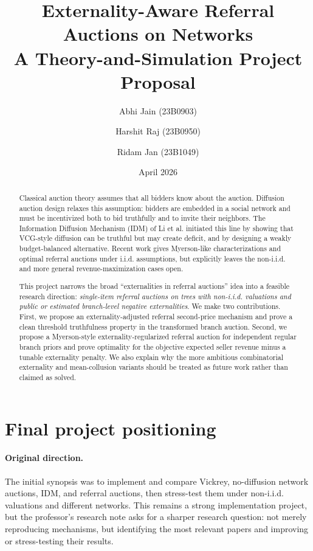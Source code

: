 \documentclass[11pt]{article}
\title{Externality-Aware Referral Auctions on Networks\\
\large A Theory-and-Simulation Project Proposal}
\author{Abhi Jain (23B0903) \and Harshit Raj (23B0950) \and Ridam Jan (23B1049)}
\date{April 2026}
\begin{document}
\maketitle

\begin{abstract}
Classical auction theory assumes that all bidders know about the auction. Diffusion auction design relaxes this assumption: bidders are embedded in a social network and must be incentivized both to bid truthfully and to invite their neighbors. The Information Diffusion Mechanism (IDM) of Li et al. initiated this line by showing that VCG-style diffusion can be truthful but may create deficit, and by designing a weakly budget-balanced alternative. Recent work gives Myerson-like characterizations and optimal referral auctions under i.i.d. assumptions, but explicitly leaves the non-i.i.d. and more general revenue-maximization cases open.

This project narrows the broad ``externalities in referral auctions'' idea into a feasible research direction: \emph{single-item referral auctions on trees with non-i.i.d. valuations and public or estimated branch-level negative externalities}. We make two contributions. First, we propose an externality-adjusted referral second-price mechanism and prove a clean threshold truthfulness property in the transformed branch auction. Second, we propose a Myerson-style externality-regularized referral auction for independent regular branch priors and prove optimality for the objective expected seller revenue minus a tunable externality penalty. We also explain why the more ambitious combinatorial externality and mean-collusion variants should be treated as future work rather than claimed as solved.
\end{abstract}

\section{Final project positioning}

\paragraph{Original direction.} The initial synopsis was to implement and compare Vickrey, no-diffusion network auctions, IDM, and referral auctions, then stress-test them under non-i.i.d. valuations and different networks. This remains a strong implementation project, but the professor's research note asks for a sharper research question: not merely reproducing mechanisms, but identifying the most relevant papers and improving or stress-testing their results.
\end{document}
